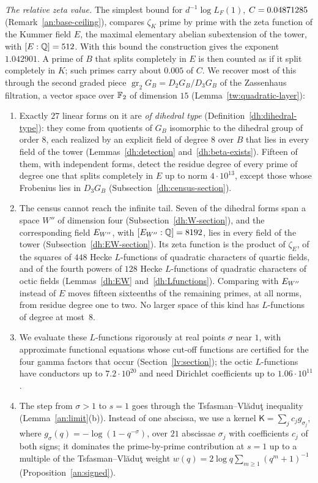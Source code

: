 \emph{The relative zeta value.} The simplest bound for
$d^{-1}\log L_F(1)$, $C=0.04871285$ (Remark~\ref{an:base-ceiling}),
compares $\zeta_K$ prime by prime with the zeta function of the Kummer
field $E$, the maximal elementary abelian subextension of the tower,
with $[E:\mathbb Q]=512$. With this bound the construction gives the exponent
$1.042901$. A prime of $B$ that splits completely in $E$ is then
counted as if it split completely in $K$; such primes carry about $0.005$
of $C$. We recover most of this through the second graded piece
$\operatorname{gr}_2G_B=D_2G_B/D_3G_B$ of the Zassenhaus filtration, a
vector space over $\mathbb F_2$ of dimension $15$ (Lemma~\ref{tw:quadratic-layer}):
\begin{enumerate}
\item[(a)] Exactly $27$ linear forms on it are \emph{of dihedral type}
 (Definition~\ref{dh:dihedral-type}):
 they come from quotients of $G_B$ isomorphic to the dihedral group of
 order $8$, each realized by an explicit field of degree $8$ over $B$
 that lies in every field of the tower (Lemmas~\ref{dh:detection}
 and~\ref{dh:beta-exists}). Fifteen
 of them, with independent forms, detect the residue degree of every
 prime of degree one that splits completely in $E$ up to norm
 $4\cdot10^{13}$, except those whose Frobenius lies in $D_3G_B$
 (Subsection~\ref{dh:census-section}).
\item[(b)] The census cannot reach the infinite tail. Seven of the
 dihedral forms span a space $W''$ of dimension four
 (Subsection~\ref{dh:W-section}), and the corresponding field $E_{W''}$, with
 $[E_{W''}:\mathbb Q]=8192$, lies in every field of the tower
 (Subsection~\ref{dh:EW-section}). Its zeta function is
 the product of $\zeta_E$, of the squares of $448$ Hecke $L$-functions
 of quadratic characters of quartic fields, and of the fourth powers of
 $128$ Hecke $L$-functions of quadratic characters of octic fields
 (Lemmas~\ref{dh:EW} and~\ref{dh:Lfunctions}). Comparing with $E_{W''}$ instead of $E$ moves fifteen
 sixteenths of the remaining primes, at all norms, from residue degree
 one to two. No larger space of this kind has $L$-functions of degree
 at most~$8$.
\item[(c)] We evaluate these $L$-functions rigorously at real points
 $\sigma$ near $1$, with approximate functional equations whose cut-off
 functions are certified for the four gamma factors that occur
 (Section~\ref{lv:section}); the octic $L$-functions have conductors up
 to $7.2\cdot10^{20}$ and need Dirichlet coefficients up to
 $1.06\cdot10^{11}$.
\item[(d)] The step from $\sigma>1$ to $s=1$ goes through the
 Tsfasman--Vl\u{a}du\c{t} inequality \cite[Proposition~3.1]{TsfasmanVladut2002}
 (Lemma~\ref{an:limit}(b)). Instead of one abscissa, we use a kernel
 $\mathsf K=\sum_jc_jg_{\sigma_j}$, where $g_\sigma(q)=-\log(1-q^{-\sigma})$,
 over $21$ abscissae $\sigma_j$ with coefficients $c_j$ of both signs;
 it dominates the prime-by-prime contribution at $s=1$ up to a multiple
 of the Tsfasman--Vl\u{a}du\c{t} weight
 $w(q)=2\log q\sum_{m\ge1}(q^m+1)^{-1}$ (Proposition~\ref{an:signed}).
\end{enumerate}
